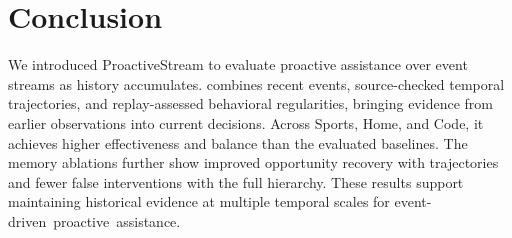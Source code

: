 \section{Conclusion}
\label{sec:conclusion}

We introduced ProactiveStream to evaluate proactive assistance over event streams as history accumulates.
\system{} combines recent events, source-checked temporal trajectories, and replay-assessed behavioral regularities, bringing evidence from earlier observations into current decisions.
Across Sports, Home, and Code, it achieves higher effectiveness and balance than the evaluated baselines.
The memory ablations further show improved opportunity recovery with trajectories and fewer false interventions with the full hierarchy.
These results support maintaining historical evidence at multiple temporal scales for \mbox{event-driven proactive assistance}.
